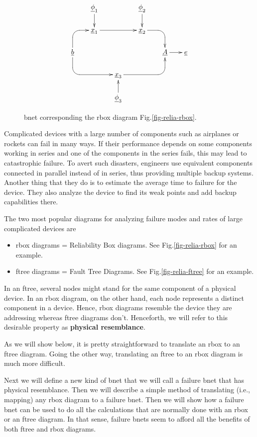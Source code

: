 \begin{figure}[h!]
\centering
$$\xymatrix@-.5pc{
&\ul{\phi}_1\ar[d]&&\ul{\phi}_2\ar[d]
\\
&\rvx_1\ar[rr]
&&
\rvx_2
\ar `r[rd][rd]
\\
\rvb\ar`u[u][ru]
\ar`d[dr][rrd]
&&&&\rvA\ar[r]&\rve
\\
&&
\rvx_3
\ar `r[rru][rru]
\\
&&\ul{\phi}_3\ar[u]
}$$
\caption{bnet corresponding
the rbox diagram 
Fig.\ref{fig-relia-rbox}.}
\label{fig-relia-bnet}
\end{figure}

Complicated devices
with a large number 
of components
such as airplanes or rockets can
fail in many
ways. If
their performance
depends 
on some components
working in series
and one 
of the components
in the series
fails, this
may lead to
catastrophic failure.
To avert
such disasters,
engineers use equivalent
components
connected in parallel
instead of in series,
thus providing multiple backup
systems.
Another thing that
they do is
to estimate the
average time to failure
for the device. They also
analyze the
device to find its 
weak points and add
backup capabilities 
there.



The two 
most popular diagrams
for analyzing failure modes and rates
of large complicated devices
are
\begin{itemize}
\item
rbox diagrams = Reliability Box diagrams. 
See Fig.\ref{fig-relia-rbox} for an example.
\item
ftree diagrams = Fault Tree Diagrams.
See Fig.\ref{fig-relia-ftree} for an example.
\end{itemize}
In an ftree,
several nodes might
stand for the same 
component of a physical device.
In an rbox diagram,
on the
other hand, 
each node
represents a distinct  component
in a device. Hence, rbox diagrams
resemble the device they are
addressing
whereas ftree diagrams don't.
Henceforth, we will
refer to this desirable property
as {\bf  physical resemblance}.

As we will
show below,
it is pretty
straightforward
to translate
an rbox to  an ftree diagram.
Going the other
way, translating
an ftree to an rbox diagram
is much more difficult.



Next we will define
a new kind of bnet
that we will call a failure bnet
that has physical resemblance.
Then we will describe
a simple method of translating (i.e., mapping)
any rbox diagram to a failure bnet.
Then we will show
how a failure
bnet can be used
to do all the
calculations
that are normally
done with an rbox
or an ftree diagram.
In that sense,
failure bnets
seem to afford
all the benefits
of both ftree and rbox 
diagrams.


